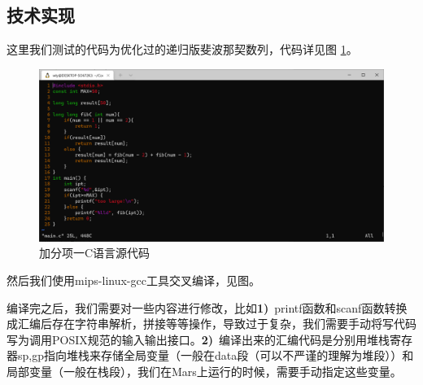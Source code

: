 \documentclass[12pt]{article} %
\begin{document}
\subsection{技术实现}
这里我们测试的代码为优化过的递归版斐波那契数列，代码详见图 \ref{fig:ExtraProCSource1}。
\begin{figure}[ht]
	\centering
	\includegraphics[width=\textwidth]{figures/figure1.png}
	\caption{加分项一C语言源代码}
	\label{fig:ExtraProCSource1}
\end{figure}
然后我们使用mips-linux-gcc工具交叉编译，见图。


编译完之后，我们需要对一些内容进行修改，比如\textbf{1)}\ printf函数和scanf函数转换成汇编后存在字符串解析，拼接等等操作，导致过于复杂，我们需要手动将写代码写为调用POSIX规范的输入输出接口。\textbf{2)}\ 编译出来的汇编代码是分别用堆栈寄存器sp,gp指向堆栈来存储全局变量（一般在data段（可以不严谨的理解为堆段））和局部变量（一般在栈段），我们在Mars上运行的时候，需要手动指定这些变量。
\end{document}
